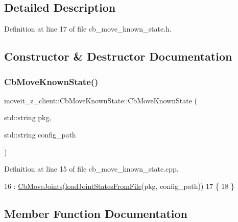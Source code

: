 \subsection{Detailed Description}


Definition at line 17 of file cb\+\_\+move\+\_\+known\+\_\+state.\+h.



\subsection{Constructor \& Destructor Documentation}
\mbox{\label{classmoveit__z__client_1_1CbMoveKnownState_a8840d740bac0275a2ead514bf72f31b2}} 
\subsubsection{\texorpdfstring{Cb\+Move\+Known\+State()}{CbMoveKnownState()}}
{\footnotesize\ttfamily moveit\+\_\+z\+\_\+client\+::\+Cb\+Move\+Known\+State\+::\+Cb\+Move\+Known\+State (\begin{DoxyParamCaption}\item[{std\+::string}]{pkg,  }\item[{std\+::string}]{config\+\_\+path }\end{DoxyParamCaption})}



Definition at line 15 of file cb\+\_\+move\+\_\+known\+\_\+state.\+cpp.


\begin{DoxyCode}
16   : \hyperlink{classmoveit__z__client_1_1CbMoveJoints_a8d9f24fd96baa202c546654f3e92f51c}{CbMoveJoints}(\hyperlink{classmoveit__z__client_1_1CbMoveKnownState_ac5b7069781a33407d56cb19c2811a098}{loadJointStatesFromFile}(pkg, config\_path))
17 \{
18 \}
\end{DoxyCode}


\subsection{Member Function Documentation}
\mbox{\label{classmoveit__z__client_1_1CbMoveKnownState_ac5b7069781a33407d56cb19c2811a098}} 
